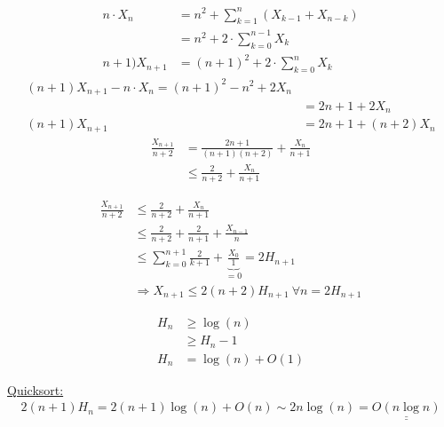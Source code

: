 \begin{align*}
    n \cdot X_n &= n^2 + \sum_{k=1}^{n}(X_{k-1} + X_{n-k})\\
    &= n^2 + 2 \cdot \sum_{k =0}^{n-1} X_k\\
    n+1) X_{n+1} &= (n+1)^2 + 2 \cdot \sum_{k=0}^n  X_k
\end{align*}
\begin{align*}
    (n+1)X_{n+1} - n \cdot X_n = (n+1)^2 - n^2 +2 X_n\\
    &= 2n +1 + 2X_n\\
    (n+1)X_{n+1} &= 2n + 1 + (n+2) X_n
\end{align*}
\begin{align*}
    \frac{X_{n+1}}{n+2} &= \frac{2n+1}{(n+1)(n+2)} + \frac{X_n}{n+1}\\
    &\leq \frac{2}{n+2} + \frac{X_n}{n+1}
\end{align*}

\begin{align*}
    \frac{X_{n+1}}{n+2} &\leq \frac{2}{n+2} + \frac{X_n}{n+1}\\
    &\leq \frac{2}{n+2} + \frac{2}{n+1} + \frac{X_{n-1}}{n}\\
    &\leq \sum_{k=0}^{n +1} \frac{2}{k+1} + \underbrace{\frac{X_0}{1}}_{=0} = 2 H_{n+1}\\
    &\Rightarrow X_{n+1} \leq 2(n+2) H_{n+1} \: \forall n = 2 H_{n+1}
\end{align*}

\begin{align*}
    H_n &\geq \log(n)\\
    &\geq H_n -1\\
    H_n &= \log(n) + O(1)
\end{align*}

\underline{Quicksort:}
\begin{align*}
    2(n+1) H_n = 2(n+1) \log(n) + O(n) \sim 2n\log(n) = \underline{\underline{O(n\log n)}}
\end{align*}